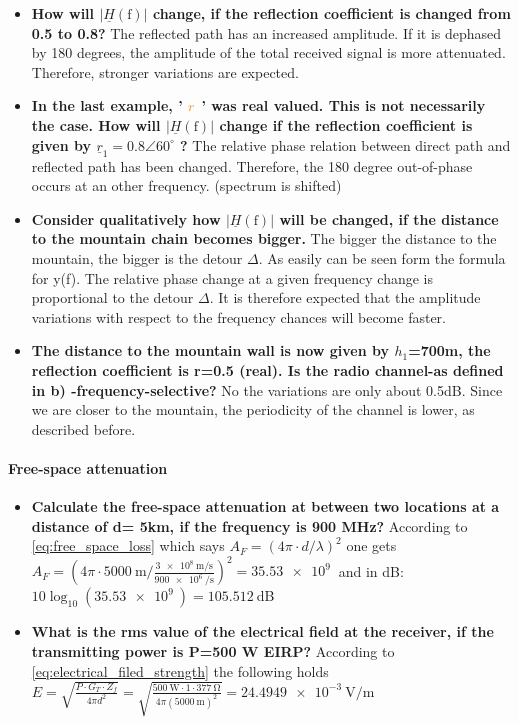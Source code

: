 \begin{itemize}
    \item \textbf{How will $|\underline{H}(\mathrm{f})|$ change, if the reflection coefficient is changed from 0.5 to 0.8?} \newline
    The reflected path has an increased amplitude. If it is dephased by 180 degrees, the amplitude of the total received signal is more attenuated. Therefore, stronger variations are expected.
    \item\textbf{ In the last example, ' $\textcolor{orange}{r}$ ' was real valued. This is not necessarily the case. How will $|\underline{H}(\mathrm{f})|$ change if the reflection coefficient is given by $\underline{r}_1=0.8 \angle 60^{\circ}$ ?}\newline
    The relative phase relation between direct path and reflected path has been changed. Therefore, the 180 degree out-of-phase occurs at an other frequency. (spectrum is shifted)
    \item \textbf{Consider qualitatively how $|\underline{H}(\mathrm{f})|$ will be changed, if the distance to the mountain chain becomes bigger.}\newline
    The bigger the distance to the mountain, the bigger is the detour $\Delta$. As easily can be seen form the formula for y(f). The relative phase change at a given frequency change is proportional to the detour $\Delta$. It is therefore expected that the amplitude variations with respect to the frequency chances will become faster.
    \item \textbf{The distance to the mountain wall is now given by $h_1$=700m, the reflection coefficient is r=0.5 (real). Is the radio channel-as defined in b) -frequency-selective?}\newline
    No the variations are only about 0.5dB. Since we are closer to the mountain, the periodicity of the channel is lower, as described before.

\end{itemize}
\paragraph{Free-space attenuation}
\begin{itemize}
    \item \textbf{Calculate the free-space attenuation at between two locations at a distance of d= 5km, if the frequency is 900 MHz?}\newline
    According to \autoref{eq:free_space_loss} which says $A_F=(4 \pi \cdot d / \lambda)^2$ one gets $A_F=(4 \pi \cdot \SI{5000}{\meter} / \frac{\SI{3e8}{\meter\per\second}}{\SI{900e6}{\per\second}})^2=\SI{35.53e9}{}$ and in dB: $10\log_{10}(\SI{35.53e9}{})=\SI{105.512}{}$dB
    \item \textbf{What is the rms value of the electrical field at the receiver, if the transmitting power is P=500 W EIRP?}\newline
    According to \autoref{eq:electrical_filed_strength} the following holds $E=\sqrt{\frac{P \cdot G_T \cdot Z_f}{4 \pi d^2}}=\sqrt{\frac{\SI{500}{\watt} \cdot 1 \cdot \SI{377}{\ohm}}{4 \pi (\SI{5000}{\meter})^2}}=\SI{24.4949e-3}{\volt\per\meter}$
\end{itemize}

